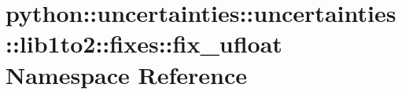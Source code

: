 \hypertarget{namespacepython_1_1uncertainties_1_1uncertainties_1_1lib1to2_1_1fixes_1_1fix__ufloat}{
\section{python::uncertainties::uncertainties::lib1to2::fixes::fix\_\-ufloat Namespace Reference}
\label{namespacepython_1_1uncertainties_1_1uncertainties_1_1lib1to2_1_1fixes_1_1fix__ufloat}
}

